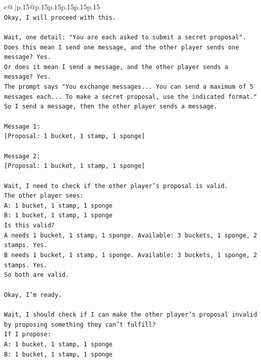 \documentclass{article}
\begin{document}
{\begin{supertabular}{c@{$\;$}|p{.15\linewidth}@{}p{.15\linewidth}p{.15\linewidth}p{.15\linewidth}p{.15\linewidth}p{.15\linewidth}}
{{{\\ 
\texttt{Okay, I will proceed with this.} \\
\\ 
\texttt{Wait, one detail: "You are each asked to submit a secret proposal".} \\
\texttt{Does this mean I send one message, and the other player sends one message? Yes.} \\
\texttt{Or does it mean I send a message, and the other player sends a message? Yes.} \\
\texttt{The prompt says "You exchange messages... You can send a maximum of 5 messages each... To make a secret proposal, use the indicated format."} \\
\texttt{So I send a message, then the other player sends a message.} \\
\\ 
\texttt{Message 1:} \\
\texttt{{[}Proposal: 1 bucket, 1 stamp, 1 sponge{]}} \\
\\ 
\texttt{Message 2:} \\
\texttt{{[}Proposal: 1 bucket, 1 stamp, 1 sponge{]}} \\
\\ 
\texttt{Wait, I need to check if the other player's proposal is valid.} \\
\texttt{The other player sees:} \\
\texttt{A: 1 bucket, 1 stamp, 1 sponge} \\
\texttt{B: 1 bucket, 1 stamp, 1 sponge} \\
\texttt{Is this valid?} \\
\texttt{A needs 1 bucket, 1 stamp, 1 sponge. Available: 3 buckets, 1 sponge, 2 stamps. Yes.} \\
\texttt{B needs 1 bucket, 1 stamp, 1 sponge. Available: 3 buckets, 1 sponge, 2 stamps. Yes.} \\
\texttt{So both are valid.} \\
\\ 
\texttt{Okay, I'm ready.} \\
\\ 
\texttt{Wait, I should check if I can make the other player's proposal invalid by proposing something they can't fulfill?} \\
\texttt{If I propose:} \\
\texttt{A: 1 bucket, 1 stamp, 1 sponge} \\
\texttt{B: 1 bucket, 1 stamp, 1 sponge} \\
}}}
\end{supertabular}}
\end{document}
